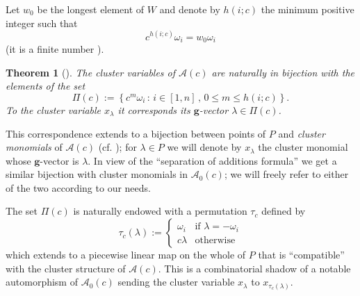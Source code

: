 \documentclass[11pt]{amsart}
\newcommand{\cA}{\mathcal{A}}
\newcommand{\bg}{\mathbf{g}}
\newtheorem{theorem}{Theorem}[section]
\numberwithin{equation}{section}
\numberwithin{figure}{section}
\begin{document}
  Let $w_0$ be the longest element of $W$ and denote by $h(i;c)$ the minimum positive integer such that 
  \[
    c^{h(i;c)}\omega_i = w_0\omega_i
  \]
  (it is a finite number \cite[Proposition 1.3]{YZ08}).
  \begin{theorem}[{\cite[Theorem 1.4]{YZ08}}]
    The cluster variables of $\cA(c)$ are naturally in bijection with the elements of the set
    \[
      \Pi(c)
      :=
      \left\{
        c^m\omega_i \, :\, i\in[1,n] \, , \, 0\leq m \leq h(i;c) 
      \right\}.
    \]
    To the cluster variable $x_\lambda$ it corresponds its $\bg$-vector $\lambda\in\Pi(c)$.
  \end{theorem}
  This correspondence extends to a bijection between points of $P$ and \emph{cluster monomials} of $\cA(c)$ (cf. \cite[Theorem 1.2]{Ste13}); for $\lambda\in P$ we will denote by $x_\lambda$ the cluster monomial whose $\bg$-vector is $\lambda$.
  In view of the ``separation of additions formula'' we get a similar bijection with cluster monomials in $\cA_0(c)$; we will freely refer to either of the two according to our needs.

  The set $\Pi(c)$ is naturally endowed with a permutation $\tau_c$ defined by
  \[
    \tau_c (\lambda) 
    :=
    \begin{cases}
      \omega_i  & \text{if $\lambda = -\omega_i$} \\
      c\lambda  & \text{otherwise}
    \end{cases}
  \]
  which extends to a piecewise linear map on the whole of $P$ that is ``compatible'' with the cluster structure of $\cA(c)$.
  This is a combinatorial shadow of a notable automorphism of $\cA_0(c)$ sending the cluster variable $x_\lambda$ to $x_{\tau_c(\lambda)}$. 
\end{document}
